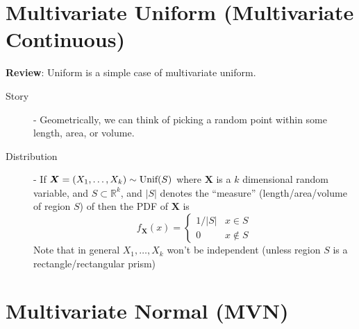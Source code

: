 \documentclass[11pt]{article}
\theoremstyle{definition}
\theoremstyle{remark}
\newcommand{\R}{\mathbb{R}}
\newcommand{\Unif}{\textnormal{Unif}}
\begin{document}
\section{Multivariate Uniform (Multivariate Continuous)}

\textbf{Review}: Uniform is a simple case of multivariate uniform. 
\begin{description}
    \item[Story] - Geometrically, we can think of picking a random point within some length, area, or volume. 
    \item[Distribution] - If $\bm{X} = (X_1, \ldots, X_k) \sim \Unif(S)$ where $\bm{X}$ is a $k$ dimensional random variable, and $S \subset \R^k$, and $|S|$ denotes the ``measure'' (length/area/volume of region $S$) of then the PDF of $\bm{X}$ is $$ f_{\bm{X}}(x) = \begin{cases} 1/|S| & x \in S \\ 0 & x \not\in S \end{cases} $$ Note that in general $X_1, \ldots, X_k$ won't be independent (unless region $S$ is a rectangle/rectangular prism)
\end{description}

\section{Multivariate Normal (MVN)}
\end{document}
